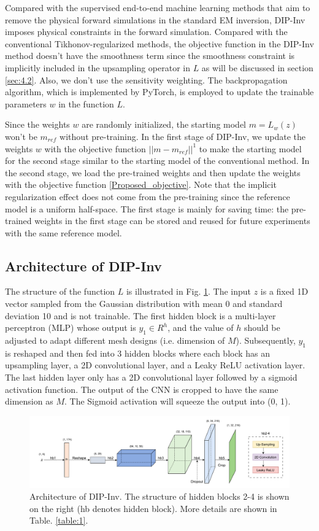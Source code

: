 \documentclass[lettersize,journal]{IEEEtran}
\begin{document}
Compared with the supervised end-to-end machine learning methods that aim to remove the physical forward simulations in the standard EM inversion, DIP-Inv imposes physical constraints in the forward simulation. Compared with the conventional Tikhonov-regularized methods, the objective function in the DIP-Inv method doesn't have the smoothness term since the smoothness constraint is implicitly included in the upsampling operator in $L$ as will be discussed in section \ref{sec:4.2}. Also, we don't use the sensitivity weighting. The backpropagation algorithm, which is implemented by PyTorch, is employed to update the trainable parameters $w$ in the function $L$. 

Since the weights $w$ are randomly initialized, the starting model $m = L_w(z)$ won't be $m_{ref}$ without pre-training. In the first stage of DIP-Inv, we update the weights $w$ with the objective function $||m-m_{ref}||^1$ to make the starting model for the second stage similar to the starting model of the conventional method.
In the second stage, we load the pre-trained weights and then update the weights with the objective function \ref{Proposed_objective}. 
Note that the implicit regularization effect does not come from the pre-training since the reference model is a uniform half-space. The first stage is mainly for saving time: the pre-trained weights in the first stage can be stored and reused for future experiments with the same reference model.

\subsection{Architecture of DIP-Inv}
The structure of the function $L$ is illustrated in Fig. \ref{fig2_2}. The input $z$ is a fixed 1D vector sampled from the Gaussian distribution with mean 0 and standard deviation 10 and is not trainable. The first hidden block is a multi-layer perceptron (MLP) whose output is $y_1 \in R^{h}$, and the value of $h$ should be adjusted to adapt different mesh designs (i.e. dimension of $M$). Subsequently, $y_1$ is reshaped and then fed into 3 hidden blocks where each block has an upsampling layer, a 2D convolutional layer, and a Leaky ReLU activation layer. 
The last hidden layer only has a 2D convolutional layer followed by a sigmoid activation function. The output of the CNN is cropped to have the same dimension as $M$. The Sigmoid activation will squeeze the output into (0, 1). 
\begin{figure}[b]
\centering
\includegraphics[width=5.75in]{Figures/xu3.pdf}
\caption{Architecture of DIP-Inv. The structure of hidden blocks 2-4 is shown on the right (hb denotes hidden block). More details are shown in Table. \ref{table:1}.}
\label{fig2_2}
\end{figure}
\end{document}
